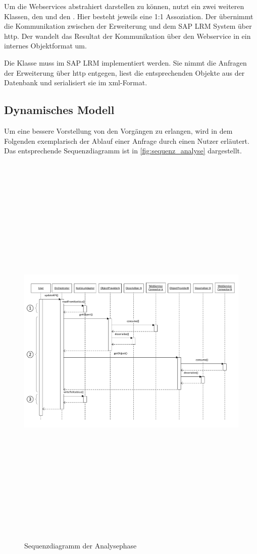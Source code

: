 \begin{onehalfspacing}
Um die Webservices abstrahiert darstellen zu können, nutzt ein  zwei weiteren Klassen, den  und den . Hier besteht jeweils eine 1:1 Assoziation. Der  übernimmt die Kommunikation zwischen der Erweiterung und dem SAP LRM System über \gls{http}. Der  wandelt das Resultat der Kommunikation über den Webservice in ein internes Objektformat um.

Die Klasse  muss im SAP LRM implementiert werden. Sie nimmt die Anfragen der Erweiterung über \gls{http} entgegen, liest die entsprechenden Objekte aus der Datenbank und serialisiert sie im \gls{xml}-Format.

\subsection{Dynamisches Modell}
Um eine bessere Vorstellung von den Vorgängen zu erlangen, wird in dem Folgenden exemplarisch der Ablauf einer Anfrage durch einen Nutzer erläutert. Das entsprechende Sequenzdiagramm ist in \vref{fig:sequenz_analyse} dargestellt.

\begin{figure}[!ht]
\setlength{\unitlength}{1mm}
\includegraphics[angle=90,height=197mm]{Visio/Analyse-Sequenz-1.pdf}
\caption{Sequenzdiagramm der Analysephase \label{fig:sequenz_analyse}}
\end{figure} 


\end{onehalfspacing}
